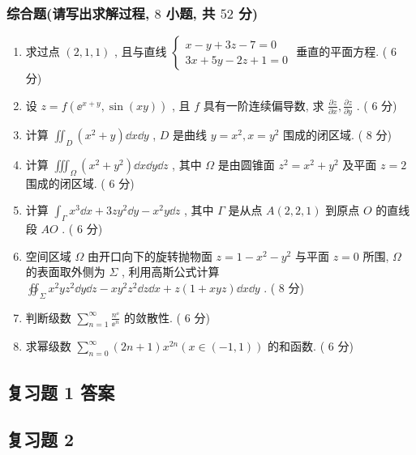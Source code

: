 \subsubsection{综合题(请写出求解过程, $8$ 小题, 共 $52$ 分)}
\begin{enumerate}
	\item 求过点 $(2,1,1)$ , 且与直线 $\begin{cases}
	x-y+3 z-7=0\\
	3 x+5 y-2 z+1=0
	\end{cases}$ 垂直的平面方程. ( $6$ 分)
	
	\item 设 $z=f\left(\ee^{x+y}, \sin (x y)\right)$ , 且 $f$ 具有一阶连续偏导数, 求 $\frac{\partial z}{\partial x}, \frac{\partial z}{\partial y}$ . ( $6$ 分)
	
	\item 计算 $\iint_{D}\left(x^{2}+y\right) \dd x \dd y$ , $D$ 是曲线 $y=x^{2}, x=y^{2}$ 围成的闭区域. ( $8$ 分)
	
	\item 计算 $\iiint_{\Omega}\left(x^{2}+y^{2}\right) \dd x \dd y \dd z$ , 其中 $\Omega$ 是由圆锥面 $z^{2}=x^{2}+y^{2}$ 及平面 $z=2$ 围成的闭区域. ( $6$ 分)
	
	\item 计算 $\int_{\Gamma} x^{3} \dd x+3 z y^{2} \dd y-x^{2} y \dd z$ , 其中 $\Gamma$ 是从点 $A(2,2,1)$ 到原点 $O$ 的直线段 $AO$ . ( $6$ 分)
	
	\item 空间区域 $\Omega$ 由开口向下的旋转抛物面 $z=1-x^{2}-y^{2}$ 与平面 $z=0$ 所围, $\Omega$ 的表面取外侧为 $\Sigma$ , 利用高斯公式计算 $\oiint_{\Sigma} x^{2} y z^{2} \dd y \dd z-x y^{2} z^{2} \dd z \dd x+z(1+x y z) \dd x \dd y$ . ( $8$ 分)
	
	\item 判断级数 $\sum_{n=1}^{\infty} \frac{n^{\ee}}{\ee^{n}}$ 的敛散性. ( $6$ 分)
	
	\item 求幂级数 $\sum_{n=0}^{\infty}(2 n+1) x^{2 n}(x \in(-1,1))$ 的和函数. ( $6$ 分)
\end{enumerate}


\subsection{复习题 1 答案}

\subsection{复习题 2}
